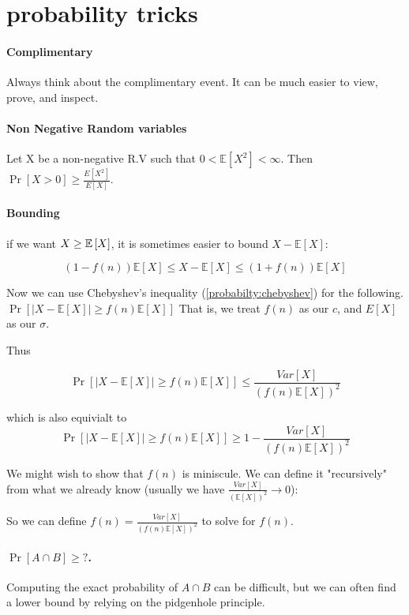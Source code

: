 \section{probability tricks}


\paragraph{\bf Complimentary}
Always think about the complimentary event. It can be much easier to view, prove, and inspect.


\paragraph{\bf Non Negative Random variables}
Let X be a non-negative R.V such that $0<\mathbb{E}[X^2]<\infty$. Then 
$\Pr[X>0]\ge \frac{E[X^2]}{E[X]}$.

\paragraph{\bf Bounding}
if we want $X\ge \mathbb{E}\left[X\right]$, it is sometimes easier to bound $X-\mathbb{E}[{X}]$:

$$\left(1-f\left(n\right)\right)\mathbb{E}[{X}]\le X-\mathbb{E}[{X}]\le\left(1+f\left(n\right)\right)\mathbb{E}[{X}]$$

Now we can use Chebyshev's inequality (\autoref{probabilty:chebyshev}) for the following.
$\Pr[\left|X-\mathbb{E}[X]\right|\ge f\left(n\right)\mathbb{E}[{X}]]$
That is, we treat $f(n)$ as our $c$, and $E[X]$ as our $\sigma$.

Thus 

$$\Pr\left[\left|X-\mathbb{E}[X]\right|\ge f\left(n\right)\mathbb{E}[{X}]\right]\le\frac{Var\left[X\right]}{\left(f\left(n\right)\mathbb{E}[{X}]\right)^{2}}
$$
\begin{insight}
    which is also equivialt to 
    $$\Pr\left[\left|X-\mathbb{E}[X]\right|\ge f\left(n\right)\mathbb{E}[{X}]\right]\ge 1 - \frac{Var\left[X\right]}{\left(f(n)\mathbb{E}[{X}]\right)^{2}}
$$
\end{insight}


We might wish to show that $f(n)$ is miniscule. We can define it "recursively" from what we already know (usually we have $\frac{Var\left[X\right]}{\left(\mathbb{E}[{X}]\right)^{2}}\to 0$):

So we can define $f(n)= \frac{Var\left[X\right]}{\left(f(n)\mathbb{E}[{X}]\right)^{2}}$ to solve for $f(n)$.


\paragraph{\bf $\Pr{[A\cap B]}\ge ?$.}
Computing the exact probability of $A\cap B$ can be difficult, but we can often find a lower bound
by relying on the pidgenhole principle.

